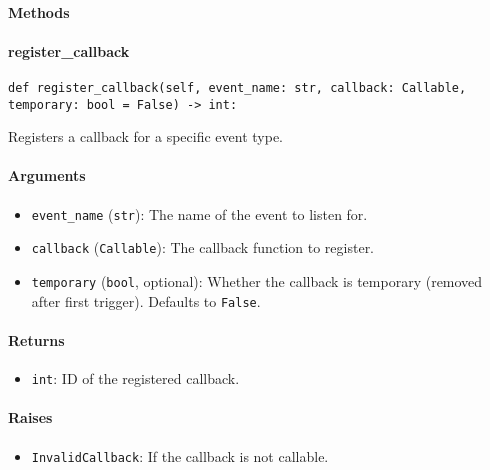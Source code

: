 \documentclass{article}
\begin{document}
\paragraph{Methods}
\paragraph{register\_callback}

\begin{lstlisting}[style=pythonstyle]
def register_callback(self, event_name: str, callback: Callable, temporary: bool = False) -> int:
\end{lstlisting}

\noindent Registers a callback for a specific event type.

\paragraph{Arguments}

\begin{itemize}
    \item \lstinline[style=pythonstyle]|event_name| (\lstinline[style=pythonstyle]|str|): The name of the event to listen for.
    \item \lstinline[style=pythonstyle]|callback| (\lstinline[style=pythonstyle]|Callable|): The callback function to register.
    \item \lstinline[style=pythonstyle]|temporary| (\lstinline[style=pythonstyle]|bool|, optional): Whether the callback is temporary (removed after first trigger). Defaults to \lstinline[style=pythonstyle]|False|.
\end{itemize}

\paragraph{Returns}

\begin{itemize}
    \item \lstinline[style=pythonstyle]|int|: ID of the registered callback.
\end{itemize}

\paragraph{Raises}

\begin{itemize}
    \item \lstinline[style=pythonstyle]|InvalidCallback|: If the callback is not callable.
\end{itemize}
\end{document}
